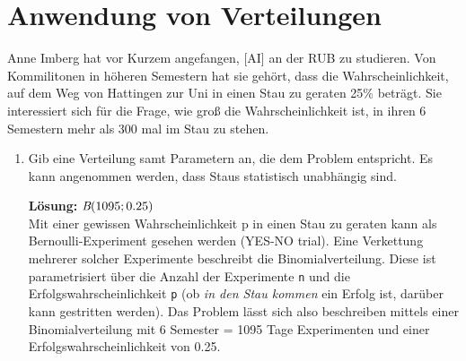 \documentclass[11pt, a4paper]{article}
\begin{document}
\newpage
\section{Anwendung von Verteilungen}
Anne Imberg hat vor Kurzem angefangen, \textcolor{AI-BLUE}{[AI]} an der RUB zu studieren. Von Kommilitonen in höheren Semestern hat sie gehört, dass die Wahrscheinlichkeit, auf dem Weg von Hattingen zur Uni in einen Stau zu geraten 25\% beträgt. Sie interessiert sich für die Frage, wie groß die Wahrscheinlichkeit ist, in ihren 6 Semestern mehr als 300 mal im Stau zu stehen.

\begin{enumerate}[label=\alph*)]
	\item Gib eine Verteilung samt Parametern an, die dem Problem entspricht. Es kann angenommen werden, dass Staus statistisch unabhängig sind.
	
	\textbf{Lösung:} $\emph{B}(1095;0.25)$ \\
	Mit einer gewissen Wahrscheinlichkeit p in einen Stau zu geraten kann als Bernoulli-Experiment gesehen werden (YES-NO trial). Eine Verkettung mehrerer solcher Experimente beschreibt die Binomialverteilung. Diese ist parametrisiert über die Anzahl der Experimente \texttt{n} und die Erfolgswahrscheinlichkeit \texttt{p} (ob \emph{in den Stau kommen} ein Erfolg ist, darüber kann gestritten werden). Das Problem lässt sich also beschreiben mittels einer Binomialverteilung mit 6 Semester = 1095 Tage Experimenten und einer Erfolgswahrscheinlichkeit von 0.25.
	

\end{enumerate}
\end{document}
